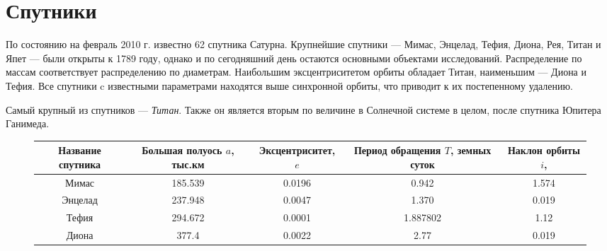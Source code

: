 \documentclass[11pt,a4paper]{article}
\begin{document}
	 \section{Спутники} 
	По состоянию на февраль 2010 г. известно 62 спутника Сатурна. Крупнейшие спутники --- Мимас, Энцелад, Тефия, Диона, Рея, Титан и Япет --- были открыты к 1789 году, однако и по сегодняшний день остаются основными объектами исследований. Распределение по массам соответствует распределению по диаметрам. Наибольшим эксцентриситетом орбиты обладает Титан, наименьшим --- Диона и Тефия. Все спутники c известными параметрами находятся выше синхронной орбиты, что приводит к их постепенному удалению.\par
	Самый крупный из спутников --- \textit{Титан}. Также он является вторым по величине в Солнечной системе в целом, после спутника Юпитера Ганимеда. 
	\begin{figure}[h!]
		\begin{tabularx}{\textwidth}{|C|C|C|C|C|}
			\hline
			Название спутника & Большая полуось $a$, тыс.км & Эксцентриситет, $e$ & Период обращения $T$, земных суток & Наклон орбиты $i$, \degree \\
			\hline
			Мимас & 185.539 & 0.0196 & 0.942 & 1.574 \\
			\hline
			Энцелад & 237.948 & 0.0047 & 1.370 & 0.019 \\
			\hline
			Тефия & 294.672 & 0.0001 & 1.887802 & 1.12 \\
			\hline
			Диона & 377.4  & 0.0022 & 2.77 & 0.019 \\
			\hline
		\end{tabularx}
	\end{figure}
\end{document}
